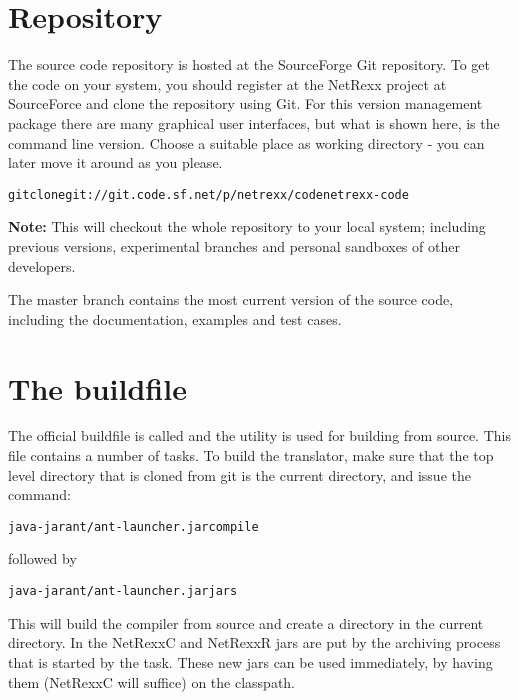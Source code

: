 {\section{Repository}
The \nr{} source code repository is hosted at the SourceForge Git repository. To get the code
on your system, you should register at the NetRexx project at SourceForce and clone the repository
using Git. For this version management package there are many
graphical user interfaces, but what is shown here, is the command line
version. Choose a suitable place as working directory - you can later
move it around as you please.
\begin{alltt}
git clone git://git.code.sf.net/p/netrexx/code netrexx-code
\end{alltt}

\begin{shaded}\noindent
\textbf{Note:} This will checkout
the whole repository to your local system; including previous
versions, experimental branches and personal sandboxes of other
developers. 
\end{shaded}\noindent
The master branch contains the most current version of the source
code, including the documentation, examples and test cases. 
\section{The buildfile}
The official buildfile is called  and the
 utility is used for building \nr{} from source. This
file contains a number of tasks. To build
the translator, make sure that the top level directory that is cloned from git is the
current directory, and issue the command:
\begin{alltt}
java -jar ant/ant-launcher.jar compile
\end{alltt}
followed by
\begin{alltt}
java -jar ant/ant-launcher.jar jars
\end{alltt}
This will build the compiler from source and create a 
directory in the current directory. In  the
NetRexxC and NetRexxR jars are put by the archiving process that is
started by the  task. These new jars can be used
immediately, by having them (NetRexxC will suffice) on the classpath.
}
